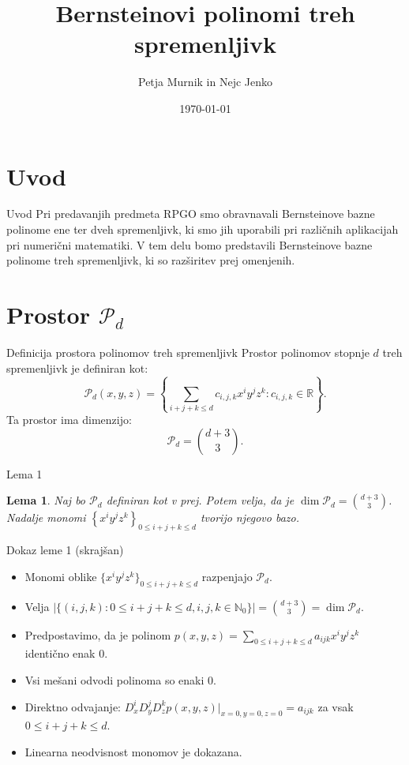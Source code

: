 \documentclass{beamer}
\title{Bernsteinovi polinomi treh spremenljivk}
\author{Petja Murnik in Nejc Jenko}
\date{\today}
\newtheorem{lemma1}{Lema}
\begin{document}
\frame{\titlepage}

\section{Uvod}
\begin{frame}{Uvod}
    Pri predavanjih predmeta RPGO smo obravnavali Bernsteinove bazne polinome ene ter dveh spremenljivk, 
    ki smo jih uporabili pri različnih aplikacijah pri numerični matematiki.
    \newline
    V tem delu bomo predstavili Bernsteinove bazne polinome treh spremenljivk, ki so razširitev prej omenjenih.
\end{frame}

\section{Prostor $\mathcal{P}_d$}
\begin{frame}{Definicija prostora polinomov treh spremenljivk}
    Prostor polinomov stopnje $d$ treh spremenljivk je definiran kot:
    \[
      \mathcal{P}_d(x, y, z) = \left\{ \sum_{i+j+k \leq d} c_{i,j,k} x^i y^j z^k : c_{i,j,k} \in \mathbb{R} \right\}.
    \]
    Ta prostor ima dimenzijo:
    \[
        \mathcal{P}_d = \binom{d+3}{3}.
    \]
\end{frame}


\begin{frame}{Lema 1}
\begin{lemma1}
    Naj bo $\mathcal{P}_d$ definiran kot v prej.
    Potem velja, da je $\dim \mathcal{P}_d = \binom{d+3}{3} $. \\
    Nadalje monomi $\left\{x^i y^j z^k \right\}_{0 \le i  + j + k \le d}$ tvorijo njegovo bazo.
\end{lemma1}
\end{frame}


\begin{frame}{Dokaz leme 1 (skrajšan)}
    \begin{itemize}
        \item Monomi oblike $\{x^i y^j z^k\}_{0 \le i + j + k \le d}$ razpenjajo $\mathcal{P}_d$.
        \item Velja $|\{(i, j, k) : 0 \le i + j + k \le d, i, j, k \in \mathbb{N}_0\}| = \binom{d+3}{3} = \dim \mathcal{P}_d$.
        \item Predpostavimo, da je polinom $p(x, y, z) = \sum_{0 \le i + j + k \le d} a_{ijk} x^i y^j z^k$ identično enak 0.
        \item Vsi mešani odvodi polinoma so enaki 0.
        \item Direktno odvajanje: $D^i_x D^j_y D^k_z p(x, y, z)|_{x=0, y=0, z=0} = a_{ijk}$ za vsak $0 \le i + j + k \le d$.
        \item Linearna neodvisnost monomov je dokazana.
    \end{itemize}
\end{frame}
\end{document}
